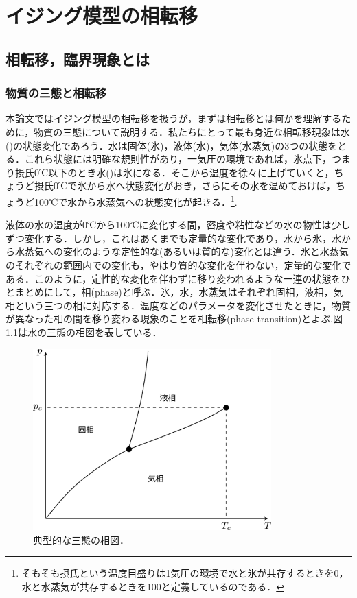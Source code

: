 \documentclass[a4paper,11pt]{jsreport}
\begin{document}
\chapter{イジング模型の相転移}
\section{相転移，臨界現象とは}
\subsection{物質の三態と相転移}
本論文ではイジング模型の相転移を扱うが，まずは相転移とは何かを理解するために，物質の三態について説明する．私たちにとって最も身近な相転移現象は水()の状態変化であろう．水は固体(氷)，液体(水)，気体(水蒸気)の3つの状態をとる．これら状態には明確な規則性があり，一気圧の環境であれば，氷点下，つまり摂氏0℃以下のとき水()は氷になる．そこから温度を徐々に上げていくと，ちょうど摂氏0℃で氷から水へ状態変化がおき，さらにその水を温めておけば，ちょうど100℃で水から水蒸気への状態変化が起きる．\footnote{そもそも摂氏という温度目盛りは1気圧の環境で水と氷が共存するときを0，水と水蒸気が共存するときを100と定義しているのである．}.\par
液体の水の温度が0℃から100℃に変化する間，密度や粘性などの水の物性は少しずつ変化する．しかし，これはあくまでも定量的な変化であり，水から氷，水から水蒸気への変化のような定性的な(あるいは質的な)変化とは違う．氷と水蒸気のそれぞれの範囲内での変化も，やはり質的な変化を伴わない，定量的な変化である．このように，定性的な変化を伴わずに移り変われるような一連の状態をひとまとめにして，相(phase)と呼ぶ．氷，水，水蒸気はそれぞれ固相，液相，気相という三つの相に対応する．温度などのパラメータを変化させたときに，物質が異なった相の間を移り変わる現象のことを相転移(phase transition)とよぶ.図\ref{三態相図}は水の三態の相図を表している．\par
\begin{figure}[H]
   \begin{center}
       \includegraphics[height=7cm]{image/三態相図.png}
       \caption{典型的な三態の相図．}
       \label{三態相図}
   \end{center}
\end{figure}
\end{document}
